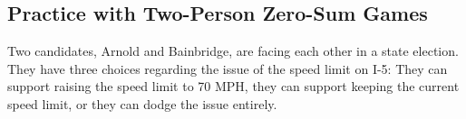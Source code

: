 

\subsection{Practice with Two-Person Zero-Sum Games}



\vspace{.1in}

Two candidates, Arnold and Bainbridge,  are facing each other in a state election. They have three choices regarding the issue of the speed limit on I-5: They can support raising the speed limit to 70 MPH, they can support keeping the current speed limit, or they can dodge the issue entirely. 


